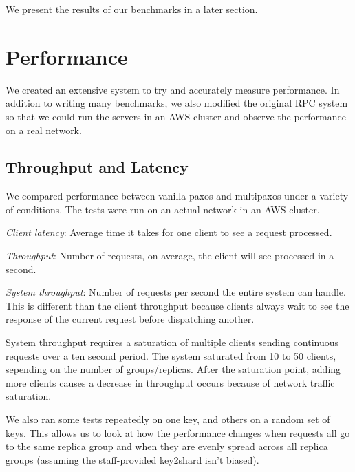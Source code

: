 \documentclass[letterpaper,10pt]{article}
\begin{document}
We present the results of our benchmarks in a later section.

\section{Performance}

We created an extensive system to try and accurately measure
performance. In addition to writing many benchmarks, we also modified
the original RPC system so that we could run the servers in an AWS
cluster and observe the performance on a real network.

\subsection{Throughput and Latency}

We compared performance between vanilla paxos and multipaxos under a
variety of conditions. The tests were run on an actual network in an
AWS cluster. 

\textit{Client latency}: Average time it takes for one client to see a
request processed. 

\textit{Throughput}: Number of requests, on average, the
client will see processed in a second.

\textit{System throughput}: Number of requests per second the entire
system can handle. This is different than the client throughput
because clients always wait to see the response of the current request
before dispatching another.

System throughput requires a saturation of multiple clients sending
continuous requests over a ten second period. The system saturated
from 10 to 50 clients, sepending on the number of
groups/replicas. After the saturation point, adding more clients
causes a decrease in throughput occurs because of network traffic
saturation.

We also ran some tests repeatedly on one key, and others on a random
set of keys. This allows us to look at how the performance changes
when requests all go to the same replica group and when they are
evenly spread across all replica groups (assuming the staff-provided
key2shard isn't biased).
\end{document}
